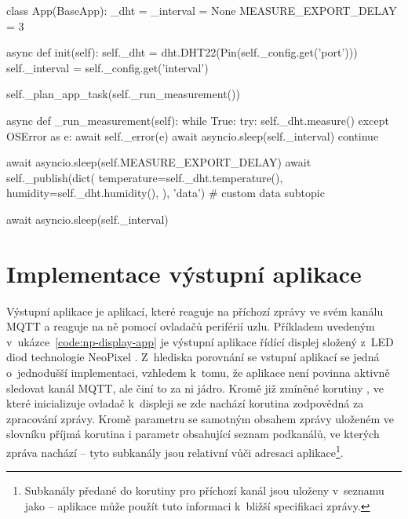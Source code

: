 \begin{code}[
    language=Python,
    caption={Implementace vstupní aplikace pro měření teploty a vlhkosti pomocí senzoru DHT -- inicializační metoda
    \ic{init} načítá parametry z~přijaté konfigurace a inicializuje řadič pro DHT senzor.
    Asynchronní měřící smyčka následně požádá ovladač o~změření, počká a vyexportuje data.
    \textit{Kód aplikace je pro zachování jednoduchosti zkrácen a upraven.}},
    label=code:dht-sensor-app
]
class App(BaseApp):
    _dht = _interval = None
    MEASURE_EXPORT_DELAY = 3

    async def init(self):
        self._dht = dht.DHT22(Pin(self._config.get('port')))
        self._interval = self._config.get('interval')

        self._plan_app_task(self._run_measurement())

    async def _run_measurement(self):
        while True:
            try:
                self._dht.measure()
            except OSError as e:
                await self._error(e)
                await asyncio.sleep(self._interval)
                continue

            await asyncio.sleep(self.MEASURE_EXPORT_DELAY)
            await self._publish(dict(
                temperature=self._dht.temperature(),
                humidity=self._dht.humidity(),
            ), 'data')  # custom data subtopic

            await asyncio.sleep(self._interval)
\end{code}

\section{Implementace výstupní aplikace}\label{subsec:implementace-vystupni-aplikace}

Výstupní aplikace je aplikací, které reaguje na příchozí zprávy ve svém kanálu MQTT a reaguje na ně pomocí ovladačů
periférií uzlu. Příkladem uvedeným v~ukázce~\ref{code:np-display-app} je výstupní aplikace řídící displej složený z~LED
diod technologie NeoPixel \cite{Esp32KolbansBook}.
Z~hlediska porovnání se vstupní aplikací se jedná o~jednodušší implementaci, vzhledem k~tomu, že aplikace není povinna
aktivně sledovat kanál MQTT, ale činí to za ni jádro. Kromě již zmíněné korutiny , ve které inicializuje
ovladač k~displeji se zde nachází korutina  zodpovědná za zpracování zprávy.
Kromě parametru  se samotným obsahem zprávy uloženém ve slovníku příjmá korutina i parametr obsahující
seznam podkanálů, ve kterých zpráva nachází -- tyto subkanály jsou relativní vůči adresaci aplikace\footnote{Subkanály
předané do korutiny  pro příchozí kanál  jsou uloženy v~seznamu
jako  -- aplikace může použít tuto informaci k~bližší specifikaci zprávy.}.

